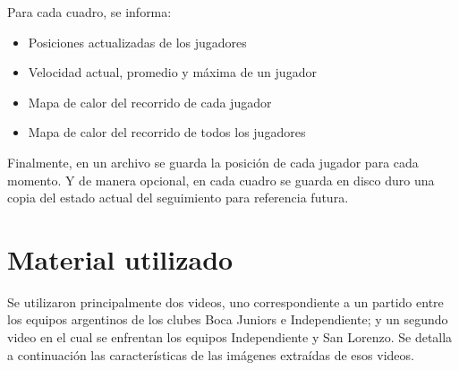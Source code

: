 Para cada cuadro, se informa:
\begin{itemize}
\item Posiciones actualizadas de los jugadores
\item Velocidad actual, promedio y máxima de un jugador
\item Mapa de calor del recorrido de cada jugador
\item Mapa de calor del recorrido de todos los jugadores
\end{itemize}

Finalmente, en un archivo se guarda la posición de cada jugador para cada momento.
Y de manera opcional, en cada cuadro se guarda en disco duro una copia del estado
actual del seguimiento para referencia futura.

\section{Material utilizado}

Se utilizaron principalmente dos videos, uno correspondiente a un partido entre
los equipos argentinos de los clubes Boca Juniors e Independiente; y un segundo
video en el cual se enfrentan los equipos Independiente y San Lorenzo. Se
detalla a continuación las características de las imágenes extraídas de esos
videos.

